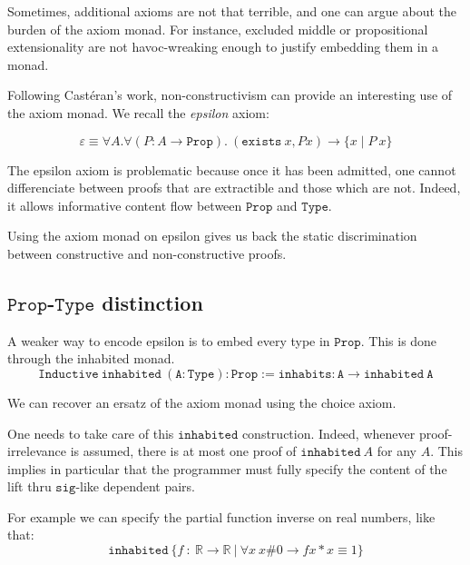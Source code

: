 \documentclass[a4paper,11pt]{article}
\newcommand{\R}{\mathbb{R}}
\theoremstyle{definition}
\theoremstyle{remark}
\begin{document}
Sometimes, additional axioms are not that terrible, and one can argue about the burden of the axiom monad. For instance, excluded middle or propositional extensionality are not havoc-wreaking enough to justify embedding them in a monad.

Following Castéran's work, non-constructivism can provide an interesting use of the axiom monad. We recall the \emph{epsilon} axiom:

$$\varepsilon ≡ \forall A.\forall (P : A\rightarrow  \mathtt{Prop}).\ (\mathtt{exists}\ x, P x) \rightarrow \{x\mid P\  x\}$$

The epsilon axiom is problematic because once it has been admitted, one cannot differenciate between proofs that are extractible and those which are not. Indeed, it allows informative content flow between $\mathtt{Prop}$ and $\mathtt{Type}$.

Using the axiom monad on epsilon gives us back the static discrimination between constructive and non-constructive proofs.

\subsection{$\mathtt{Prop}$-$\mathtt{Type}$ distinction}

A weaker way to encode epsilon is to embed every type in $\mathtt{Prop}$. This is done through the inhabited monad.
$$\mathtt{Inductive\ inhabited\ (A : Type) : Prop :=  inhabits : A \rightarrow inhabited\ A}$$

We can recover an ersatz of the axiom monad using the choice axiom.

One needs to take care of this $\mathtt{inhabited}$ construction. Indeed, whenever proof-irrelevance is assumed, there is at most one proof of $\mathtt{inhabited}\ A$ for any $A$. This implies in particular that the programmer must fully specify the content of the lift thru $\mathtt{sig}$-like dependent pairs.

For example we can specify the partial function inverse on real numbers, like that:
$$\mathtt{inhabited}\ \{f\ :\ \R → \R\ |\ \forall x\ x \# 0 → f x * x ≡ 1\}$$

  
  
\end{document}

